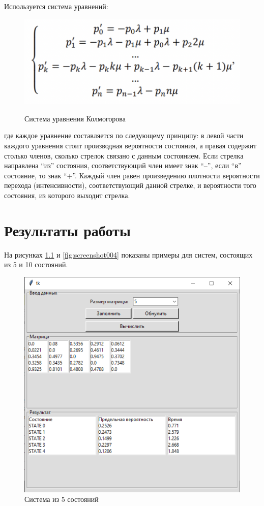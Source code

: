 \documentclass[12pt,a4paper,oneside]{report}
\begin{document}
Используется система уравнений:
\begin{figure}[H]
	\centering
	\includegraphics[scale=0.3]{2.png}
	\label{fig:screenshot002}
	\caption{Система уравнения Колмогорова}
\end{figure}
где каждое уравнение составляется по следующему принципу: в левой части каждого уравнения стоит производная вероятности состояния, а правая содержит столько членов, сколько стрелок связано с данным состоянием. Если стрелка направлена “из” состояния, соответствующий член имеет знак “–”, если “в” состояние, то знак “+”. Каждый член равен произведению плотности вероятности перехода (интенсивности), соответствующий данной стрелке, и вероятности того состояния, из которого выходит стрелка.

\chapter{Результаты работы}
На рисунках \ref{fig:screenshot003} и \ref{fig:screenshot004} показаны примеры для систем, состоящих из 5 и 10 состояний.
\begin{figure}[h]
	\centering
	\includegraphics[scale=0.59]{4.png}
	\caption{Система из 5 состояний}
	\label{fig:screenshot003}
	
\end{figure}
\end{document}

